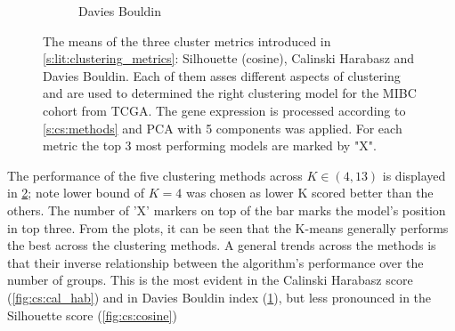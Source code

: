 \begin{figure}[H]
\begin{subfigure}[!t]{0.85\textwidth}
        \caption{Davies Bouldin}
        \label{fig:cs:dav_boul}
    \end{subfigure}
    \caption{The means of the three cluster metrics introduced in \cref{s:lit:clustering_metrics}: Silhouette (cosine), Calinski Harabasz and Davies Bouldin. Each of them asses different aspects of clustering and are used to determined the right clustering model for the MIBC cohort from TCGA. The gene expression is processed according to \cref{s:cs:methods} and PCA with 5 components was applied. For each metric the top 3 most performing models are marked by "X". }
    \label{fig:cs:cs_metrics}
\end{figure}


The performance of the five clustering methods across $K\in(4, 13)$ is displayed in
\cref{fig:cs:cs_metrics}; note lower bound of $K=4$ was chosen as lower K scored better than the others. The number of 'X' markers on top of the bar marks the model's position in top three. From the plots, it can be seen that the K-means generally performs the best across the clustering methods. A general trends across the methods is that their inverse relationship between the algorithm's performance over the number of groups. This is the most evident in the Calinski Harabasz score (\cref{fig:cs:cal_hab}) and in Davies Bouldin index (\cref{fig:cs:dav_boul}), but less pronounced in the Silhouette score (\cref{fig:cs:cosine})


